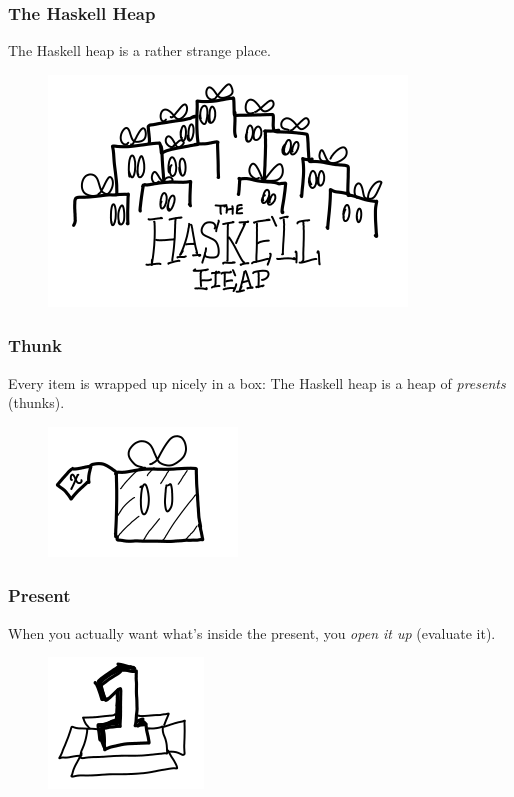 \documentclass{beamer}
\begin{document}
\begin{frame}
\frametitle{The Haskell Heap}
\begin{center}
    The Haskell heap is a rather strange place.
\end{center}
\begin{figure}[hbt!]
    \centering
    \includegraphics[height=0.5\textheight]{./pic/haskell-heap.png}
\end{figure}
\end{frame}


\begin{frame}
\frametitle{Thunk}
Every item is wrapped up nicely in a box:
\newline
The Haskell heap is a heap of \textit{presents} (thunks).
\begin{figure}[hbt!]
    \centering
    \includegraphics[height=0.5\textheight]{./pic/thunk.png}
\end{figure}
\end{frame}


\begin{frame}
\frametitle{Present}
When you actually want what’s inside the present, you \textit{open it up} (evaluate it).
\newline
\begin{figure}[hbt!]
    \centering
    \includegraphics[height=0.5\textheight]{./pic/thunk-nullary.png}
\end{figure}
\end{frame}
\end{document}

